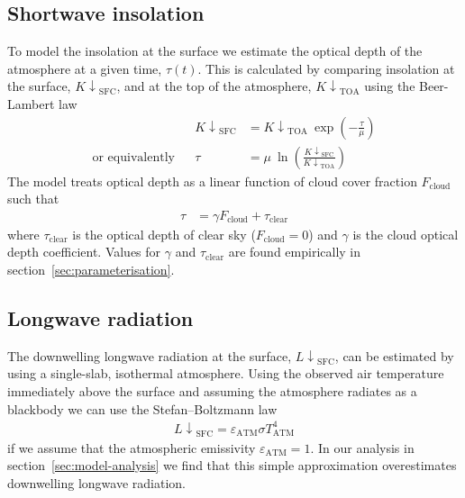 \documentclass[a4paper,titlepage, twoside]{report}
\newcommand\Kdownsfc{{K\!\!\downarrow}_\mathrm{SFC}}
\newcommand\Kdowntoa{{K\!\!\downarrow}_\mathrm{TOA}}
\newcommand\Ldownsfc{{L\!\!\downarrow}_\mathrm{SFC}}
\begin{document}
\subsection{Shortwave insolation}
To model the insolation at the surface we estimate the optical depth of the atmosphere at a given time, $\tau(t)$.  This is calculated by comparing insolation at the surface, $\Kdownsfc$, and at the top of the atmosphere, $\Kdowntoa$ using the Beer-Lambert law \parencite{stephens}
\begin{align}
&& \Kdownsfc &= \Kdowntoa\: \exp \left( -\frac{\tau}{\mu} \right) \\
\text{or equivalently} && \tau &= \mu \: \ln \left( \frac{\Kdownsfc}{\Kdowntoa} \right)
\end{align}
The model treats optical depth as a linear function of cloud cover fraction $F_\mathrm{cloud}$ such that 
\begin{align}
\tau &= \gamma F_\mathrm{cloud} + \tau_\mathrm{clear} \label{eq:linear-sw-cloud}
\end{align}
where $\tau_\mathrm{clear}$ is the optical depth of clear sky ($F_\mathrm{cloud} = 0$) and $\gamma$ is the cloud optical depth coefficient.   Values for $\gamma$ and $\tau_\mathrm{clear}$ are found empirically in section~\ref{sec:parameterisation}.

\subsection{Longwave radiation}
\label{sec:longwave-model}
The downwelling longwave radiation at the surface, $\Ldownsfc$, can be estimated by using a single-slab, isothermal atmosphere.  Using the observed air temperature immediately above the surface and assuming the atmosphere radiates as a blackbody we can use the Stefan--Boltzmann law \parencite[p. 168]{ambaum}
\begin{align}
\Ldownsfc = \varepsilon_\mathrm{ATM} \sigma T_\mathrm{ATM}^4 \label{eq:stefan-boltzmann}
\end{align}
if we assume that the atmospheric emissivity $\varepsilon_\mathrm{ATM} = 1$.  In our analysis in section~\ref{sec:model-analysis} we find that this simple approximation overestimates downwelling longwave radiation.
\end{document}
